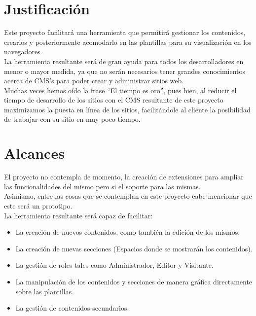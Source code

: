 \section{Justificaci\'on}
Este proyecto facilitar\'a una herramienta que permitir\'a gestionar los contenidos, crearlos y posteriormente acomodarlo en las plantillas para su visualizaci\'on en los navegadores.\\
La herramienta resultante ser\'a de gran ayuda para todos los desarrolladores en menor o mayor medida, ya que no ser\'an necesarios tener grandes conocimientos acerca de CMS's para poder crear y administrar sitios web.\\
Muchas veces hemos o\'ido la frase ``El tiempo es oro'', pues bien, al reducir el tiempo de desarrollo de los sitios con el CMS resultante de este proyecto maximizamos la puesta en l\'inea de los sitios, facilit\'andole al cliente la posibilidad de trabajar con su sitio en muy poco tiempo.

\section{Alcances}
El proyecto no contempla de momento, la creaci\'on de extensiones para ampliar las funcionalidades del mismo pero si el soporte para las mismas.\\
Asimismo, entre las cosas que se contemplan en este proyecto cabe mencionar que este ser\'a un prototipo.\\
La herramienta resultante ser\'a capaz de facilitar:
\begin{itemize}
\item La creaci\'on de nuevos contenidos, como tambi\'en la edici\'on de los mismos.
\item La creaci\'on de nuevas secciones (Espacios donde se mostrar\'an los contenidos).
\item La gesti\'on de roles tales como Administrador, Editor y Visitante.
\item La manipulaci\'on de los contenidos y secciones de manera gr\'afica directamente sobre las plantillas.
\item La gesti\'on de contenidos secundarios.
\end{itemize}

\clearpage

